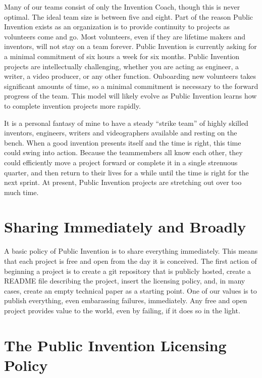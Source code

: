 \documentclass[
	fontsize=10pt, %
	twoside=false, %
	secnumdepth=1, %
]{kaobook}
\begin{document}
Many of our teams consist of only the Invention Coach,
though this is never optimal.
The ideal team size is between five and eight.
Part of the reason Public Invention exists as an
organization is to provide continuity to projects as
volunteers come and go.
Most volunteers, even if they are lifetime makers and
inventors, will not stay on a team forever.
Public Invention is currently asking for a minimal commitment of six hours a week
for six months.
Public Invention projects are intellectually challenging,
whether you are acting as engineer, a writer, a video producer,
or any other function.
Onboarding new volunteers takes significant amounts of time,
so a minimal commitment is necessary to the forward progress of the team.
This model will likely evolve as Public Invention learns
how to complete invention projects more rapidly.

It is a personal fantasy of mine to have a steady ``strike team'' of
highly skilled inventors, engineers, writers and videographers
available and resting on the bench.
When a good invention presents itself and the time is right,
this time could swing into action.
Because the teammembers all know each other, they could
efficiently move a project forward or complete it in a single strenuous quarter,
and then return to their lives for a while until the time
is right for the next sprint.
At present, Public Invention projects are stretching out over too much time.

\section{Sharing Immediately and Broadly}

A basic policy of Public Invention is to share everything immediately.
This means that each project is free and open from the day it is conceived.
The first action of beginning a project is to create a git repository that
is publicly hosted, create a README file describing the project,
insert the licensing policy, and, in many cases, create an empty
technical paper as a starting point.
One of our values is to publish everything, even embarassing failures,
immediately.
Any free and open project provides value to the world, even by failing,
if it does so in the light.

\section{The Public Invention Licensing Policy}
\end{document}

